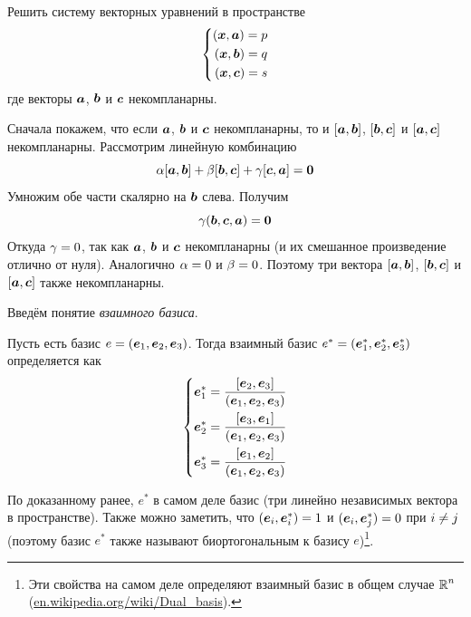 \documentclass[a4paper,12pt]{article}
\begin{document}
  
  \begin{problem}[3.31]
    Решить систему векторных уравнений в пространстве
    \[
      \left\{
        \begin{aligned}
          (\boldsymbol x, \boldsymbol a) = p\\
          (\boldsymbol x, \boldsymbol b) = q\\
          (\boldsymbol x, \boldsymbol c) = s
        \end{aligned}
      \right.
    \]
    где векторы $\boldsymbol a$, $\boldsymbol b$ и $\boldsymbol c$ некомпланарны.
  \end{problem}
  
  \begin{solution}
    Сначала покажем, что если $\boldsymbol a$, $\boldsymbol b$ и $\boldsymbol c$ некомпланарны, то и $[\boldsymbol a, \boldsymbol b]$, $[\boldsymbol b, \boldsymbol c]$ и $[\boldsymbol a, \boldsymbol c]$ некомпланарны.
    Рассмотрим линейную комбинацию
    \[
      \alpha [\boldsymbol a, \boldsymbol b] + \beta [\boldsymbol b, \boldsymbol c] + \gamma [\boldsymbol c, \boldsymbol a] = \boldsymbol 0
    \]
    Умножим обе части скалярно на $\boldsymbol b$ слева.
    Получим
    \[
      \gamma (\boldsymbol b, \boldsymbol c, \boldsymbol a) = \boldsymbol 0
    \]
    Откуда $\gamma \hm= 0$, так как $\boldsymbol a$, $\boldsymbol b$ и $\boldsymbol c$ некомпланарны (и их смешанное произведение отлично от нуля).
    Аналогично $\alpha \hm= 0$ и $\beta \hm= 0$.
    Поэтому три вектора $[\boldsymbol a, \boldsymbol b]$, $[\boldsymbol b, \boldsymbol c]$ и $[\boldsymbol a, \boldsymbol c]$ также некомпланарны.
    
    \bigskip
    
    Введём понятие \emph{взаимного базиса}.
    
    \begin{definition}
      Пусть есть базис $e \hm= (\bds e_1, \bds e_2, \bds e_3)$.
      Тогда взаимный базис $e^* \hm= (\bds e_1^*, \bds e_2^*, \bds e_3^*)$ определяется как
      \begin{equation}\label{eq:dual-basis}
        \left\{
          \begin{aligned}
            &\boldsymbol e_1^* = \frac{[\boldsymbol e_2, \boldsymbol e_3]}{(\boldsymbol e_1, \boldsymbol e_2, \boldsymbol e_3)}\\
            &\boldsymbol e_2^* = \frac{[\boldsymbol e_3, \boldsymbol e_1]}{(\boldsymbol e_1, \boldsymbol e_2, \boldsymbol e_3)}\\
            &\boldsymbol e_3^* = \frac{[\boldsymbol e_1, \boldsymbol e_2]}{(\boldsymbol e_1, \boldsymbol e_2, \boldsymbol e_3)}
          \end{aligned}
        \right.
      \end{equation}
    \end{definition}
    
    По доказанному ранее, $e^*$ в самом деле базис (три линейно независимых вектора в пространстве).
    Также можно заметить, что $(\bds e_i, \bds e_i^*) \hm= 1$ и $(\bds e_i, \bds e_j^*) \hm= 0$ при $i \hm{\not=} j$ (поэтому базис $e^*$ также называют биортогональным к базису $e$)\footnote{Эти свойства на самом деле определяют взаимный базис в общем случае $\operatorname{\mathbb R}^n$ (\href{https://en.wikipedia.org/wiki/Dual\_basis}{en.wikipedia.org/wiki/Dual\_basis}).}.
    

\end{solution}
\end{document}
